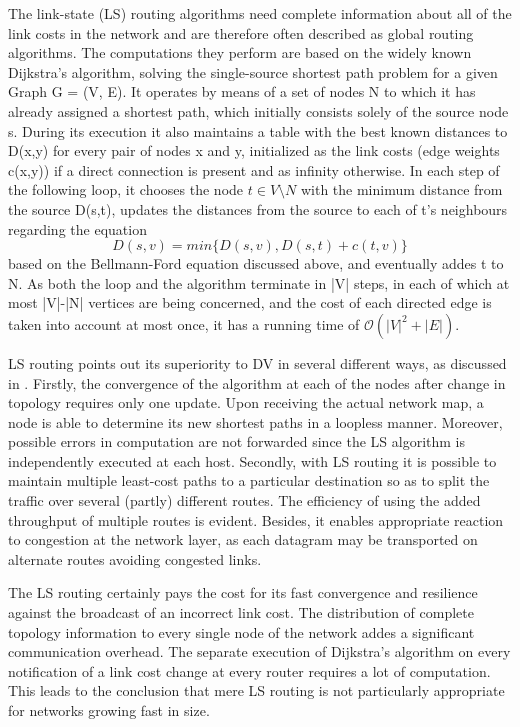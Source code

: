 \documentclass{acm_proc_article-sp}
\begin{document}
The link-state (LS) routing algorithms need complete information about all of the link costs in the network and are therefore often described as global routing algorithms. The computations they perform are based on the widely known Dijkstra's algorithm, solving the single-source shortest path problem for a given Graph G = (V, E). It operates by means of a set of nodes N to which it has already assigned a shortest path, which initially consists solely of the source node s. During its execution it also maintains a table with the best known distances to D(x,y) for every pair of nodes x and y, initialized as the link costs (edge weights c(x,y)) if a direct connection is present and as infinity otherwise. In each step of the following loop, it chooses the node $t \in V \setminus N$ with the minimum distance from the source D(s,t), updates the distances from the source to each of t's neighbours regarding the equation  \begin{equation*} D(s,v) = min \{D(s,v) , D(s,t)+c(t,v)\} \end{equation*} based on the Bellmann-Ford equation discussed above, and eventually addes t to N. As both the loop and the algorithm terminate in |V| steps, in each of which at most |V|-|N| vertices are being concerned, and the cost of each directed edge is taken into account at most once, it has a running time of $\mathcal{O}(|V|^2+|E|)$.

LS routing points out its superiority to DV in several different ways, as discussed in \cite{huitema}. Firstly, the convergence of the algorithm at each of the nodes after change in topology requires only one update. Upon receiving the actual network map, a node is able to determine its new shortest paths in a loopless manner. Moreover, possible errors in computation are not forwarded since the LS algorithm is independently executed at each host. Secondly, with LS routing it is possible to maintain multiple least-cost paths to a particular destination so as to split the traffic over several (partly) different routes. The efficiency of using the added throughput of multiple routes is evident. Besides, it enables appropriate reaction to congestion at the network layer, as each datagram may be transported on alternate routes avoiding congested links.

The LS routing certainly pays the cost for its fast convergence and resilience against the broadcast of an incorrect link cost. The distribution of complete topology information to every single node of the network addes a significant communication overhead. The separate execution of Dijkstra's algorithm on every notification of a link cost change at every router requires a lot of computation. This leads to the conclusion that mere LS routing is not particularly appropriate for networks growing fast in size.
\end{document}
